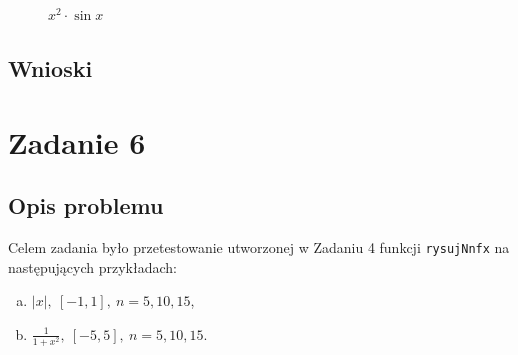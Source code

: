 \documentclass{classrep}
\begin{document}
		\begin{figure}[!htbp]
			\centering
			 \hfill
			 \hfill
  			\caption{$x^2 \cdot \sin{x}$}
  			\label{fig:2}
		\end{figure}	
		
	\subsection{Wnioski}
	
\section{Zadanie 6}	
	\subsection{Opis problemu}
		Celem zadania było przetestowanie utworzonej w Zadaniu 4 funkcji \texttt{rysujNnfx} na następujących przykładach:
			\begin{enumerate}[(a)]
				\item $|x|,~ [-1,1],~ n = 5, 10, 15$,
				\item $\frac{1}{1+x^2},~ [-5,5],~ n = 5, 10, 15$.
			\end{enumerate}
\end{document}
